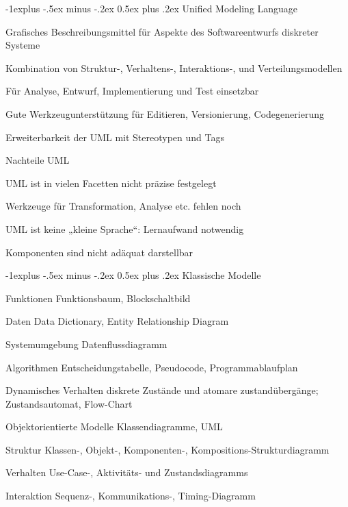 \documentclass[a4paper]{article}
\makeatletter
\renewcommand{\subsection}{\@startsection{subsection}{2}{0mm}%
                                {-1explus -.5ex minus -.2ex}%
                                {0.5ex plus .2ex}%
                                {\normalfont\normalsize\bfseries}}
\makeatother
\begin{document}
\begin{multicols}{3}
  \subsection{Unified Modeling Language}
  \begin{itemize*}
    \item Grafisches Beschreibungsmittel für Aspekte des Softwareentwurfs diskreter Systeme
    \item Kombination von Struktur-, Verhaltens-, Interaktions-, und Verteilungsmodellen
    \item Für Analyse, Entwurf, Implementierung und Test einsetzbar
    \item Gute Werkzeugunterstützung für Editieren, Versionierung, Codegenerierung
    \item Erweiterbarkeit der UML mit Stereotypen und Tags
  \end{itemize*}

  Nachteile UML
  \begin{itemize*}
    \item UML ist in vielen Facetten nicht präzise festgelegt
    \item Werkzeuge für Transformation, Analyse etc. fehlen noch
    \item UML ist keine „kleine Sprache“: Lernaufwand notwendig
    \item Komponenten sind nicht adäquat darstellbar
  \end{itemize*}

  \subsection{Klassische Modelle}
  \begin{description*}
    \item[Funktionen] Funktionsbaum, Blockschaltbild
    \item[Daten] Data Dictionary, Entity Relationship Diagram
    \item[Systemumgebung] Datenflussdiagramm
    \item[Algorithmen] Entscheidungstabelle, Pseudocode, Programmablaufplan
    \item[Dynamisches Verhalten] diskrete Zustände und atomare zustandübergänge; Zustandsautomat, Flow-Chart
    \item[Objektorientierte Modelle] Klassendiagramme, UML
    \item[Struktur] Klassen-, Objekt-, Komponenten-, Kompositions-Strukturdiagramm
    \item[Verhalten] Use-Case-, Aktivitäts- und Zustandsdiagramms
    \item[Interaktion] Sequenz-, Kommunikations-, Timing-Diagramm
  \end{description*}


\end{multicols}
\end{document}

